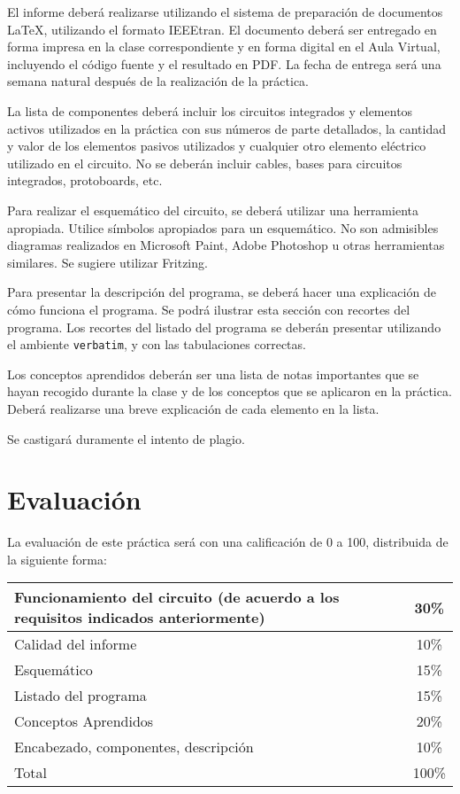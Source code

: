 \documentclass[12pt,letterpaper]{IEEEtran}
\begin{document}
El informe deberá realizarse utilizando el sistema de preparación de documentos \LaTeX, utilizando el formato IEEEtran. El documento deberá ser entregado en forma impresa en la clase correspondiente y en forma digital en el Aula Virtual, incluyendo el código fuente y el resultado en PDF.  La fecha de entrega será una semana natural después de la realización de la práctica.

La lista de componentes deberá incluir los circuitos integrados y elementos activos utilizados en la práctica con sus números de parte detallados, la cantidad y valor de los elementos pasivos utilizados y cualquier otro elemento eléctrico utilizado en el circuito. No se deberán incluir cables, bases para circuitos integrados, protoboards, etc.

Para realizar el esquemático del circuito, se deberá utilizar una herramienta apropiada. Utilice símbolos apropiados para un esquemático. No son admisibles diagramas realizados en Microsoft Paint, Adobe Photoshop u otras herramientas similares. Se sugiere utilizar Fritzing.

Para presentar la descripción del programa, se deberá hacer una explicación de cómo funciona el programa. Se podrá ilustrar esta sección con recortes del programa. Los recortes del listado del programa se deberán presentar utilizando el ambiente \texttt{verbatim}, y con las tabulaciones correctas. 

Los conceptos aprendidos deberán ser una lista de notas importantes que se hayan recogido durante la clase y de los conceptos que se aplicaron en la práctica. Deberá realizarse una breve explicación de cada elemento en la lista.

Se castigará duramente el intento de plagio.
\newpage
\section{Evaluación}

La evaluación de este práctica será con una calificación de 0 a 100, distribuida de la siguiente forma:

\begin{center}
 \begin{tabular}{p{}|c}\hline
   Funcionamiento del circuito (de acuerdo a los requisitos indicados anteriormente) 					     & 30\% \\\hline
   Calidad del informe	  				& 10\% \\\hline
   Esquemático							& 15\% \\\hline
   Listado del programa					& 15\% \\\hline
   Conceptos Aprendidos					& 20\% \\\hline
   Encabezado, componentes, descripción & 10\% \\\hline\hline
   Total								& 100\% \\
 \end{tabular}
\end{center}
\end{document}
